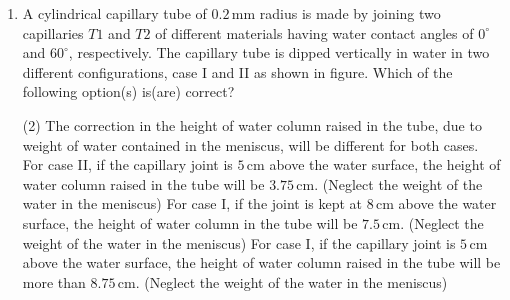 
\begin{enumerate}
    \item A cylindrical capillary tube of \(0.2 \, \text{mm}\) radius is made by joining two capillaries \(T1\) and \(T2\) of different materials having water contact angles of \(0^\circ\) and \(60^\circ\), respectively. The capillary tube is dipped vertically in water in two different configurations, case I and II as shown in figure. Which of the following option(s) is(are) correct?
        \begin{tasks}(2)
            \task The correction in the height of water column raised in the tube, due to weight of water contained in the meniscus, will be different for both cases.
            \task For case II, if the capillary joint is \(5 \, \text{cm}\) above the water surface, the height of water column raised in the tube will be \(3.75 \, \text{cm}\). (Neglect the weight of the water in the meniscus)
            \task For case I, if the joint is kept at \(8 \, \text{cm}\) above the water surface, the height of water column in the tube will be \(7.5 \, \text{cm}\). (Neglect the weight of the water in the meniscus)
            \task For case I, if the capillary joint is \(5 \, \text{cm}\) above the water surface, the height of water column raised in the tube will be more than \(8.75 \, \text{cm}\). (Neglect the weight of the water in the meniscus)
        \end{tasks}
\end{enumerate}
\begin{center}
\end{center}
